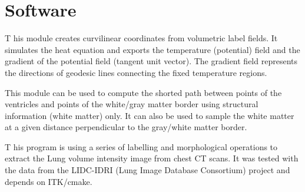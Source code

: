 \documentclass[11pt,fleqn]{book} %
\begin{document}
%	

\chapter{Software}
\newpage


\begin{multicols}{3}
    [
        \subtitle{Curvilinear coordinates in human white matter}
    ]
    \noindent \lettrine[lines=4]{\color{Black}T}{} his module creates curvilinear coordinates from volumetric label fields. 
    It simulates the heat equation and exports the temperature (potential) field and the 
    gradient of the potential field (tangent unit vector). The gradient field represents the 
    directions of geodesic lines connecting the fixed temperature regions.

    This module can be used to compute the shorted path between points of the ventricles 
    and points of the white/gray matter border using structural information (white matter) 
    only. It can also be used to sample the white matter at a given distance perpendicular to 
    the gray/white matter border.
        
\end{multicols}
    

\begin{multicols}{3}
    [
        \subtitle{Understanding lung anatomy}
    ]
    \noindent \lettrine[lines=4]{\color{Black}T}{} his program is using a series of labelling and morphological operations to extract the Lung volume intensity image from chest CT scans. It was tested with the data 
    from the LIDC-IDRI (Lung Image Database Consortium) project and depends on ITK/cmake.
    
        
\end{multicols}


\end{document}
